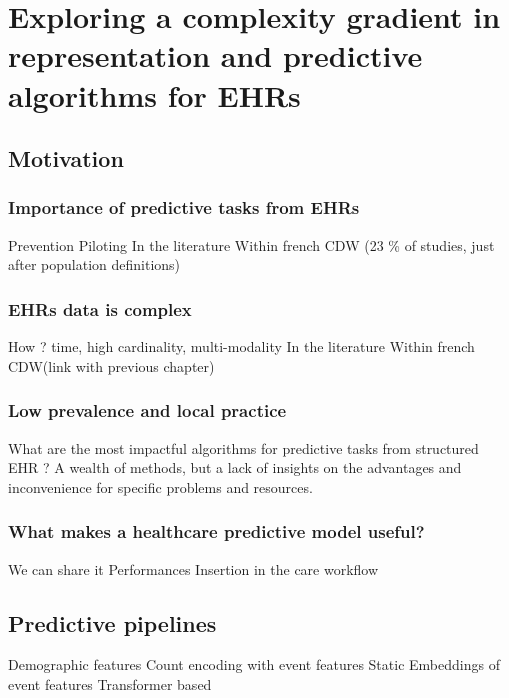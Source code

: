\documentclass{report}
\begin{document}
\chapter{Exploring a complexity gradient in representation and predictive algorithms for EHRs}\label{chapter:predictive_models}
\section{Motivation}\label{sec:predictive_models:motivation}

\subsection{Importance of predictive tasks from EHRs}\label{subsec:predictive_models:importance}
Prevention
Piloting
In the literature
Within french CDW (23 \% of studies, just after population definitions)

\subsection{EHRs data is complex}\label{subsec:predictive_models:complex_data}
How ? time, high cardinality, multi-modality
In the literature
Within french CDW(link with previous chapter)

\subsection{Low prevalence and local practice}\label{subsec:predictive_models:low_prevalence}

What are the most impactful algorithms for predictive tasks from structured EHR ?
A wealth of methods, but a lack of insights on the advantages and inconvenience for specific problems and resources.

\subsection{What makes a healthcare predictive model useful?}\label{subsec:predictive_models:useful}

We can share it
Performances
Insertion in the care workflow


\section{Predictive pipelines}\label{sec:predictive_models:pipelines}

Demographic features
Count encoding with event features
Static Embeddings of event features
Transformer based
\end{document}
